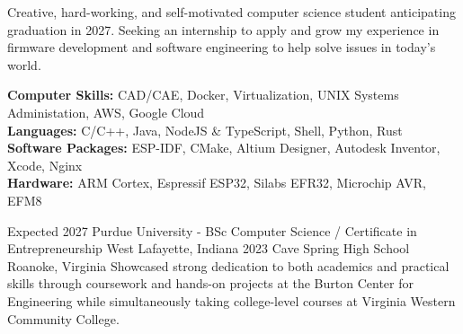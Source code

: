 \documentclass[9pt]{developercv} %
\begin{document}
\vspace{0.3cm}



\begin{minipage}[t]{1\textwidth} %
	\vspace{-\baselineskip} %
	Creative, hard-working, and self-motivated computer science student anticipating graduation in 2027. Seeking an internship to apply and grow my experience in firmware development and software engineering to help solve issues in today's world.
\end{minipage}

\vspace{0.3cm}


\begin{minipage}[t]{1\textwidth} %
	\vspace{-\baselineskip} %
	\textbf{Computer Skills:} CAD/CAE, Docker, Virtualization, UNIX Systems Administation, AWS, Google Cloud\\
	\textbf{Languages:} C/C++, Java, NodeJS \& TypeScript, Shell, Python, Rust\\
	\textbf{Software Packages:} ESP-IDF, CMake, Altium Designer, Autodesk Inventor, Xcode, Nginx\\
	\textbf{Hardware:} ARM Cortex, Espressif ESP32, Silabs EFR32, Microchip AVR, EFM8\\
\end{minipage}

\vspace{0.3cm}



\begin{entrylist}
	\entry
		{Expected 2027}
		{Purdue University - BSc Computer Science / Certificate in Entrepreneurship}
		{West Lafayette, Indiana}
		{}
	\entry
		{2023}
		{Cave Spring High School}
		{Roanoke, Virginia}
		{Showcased strong dedication to both academics and practical skills through coursework and hands-on projects at the Burton Center for Engineering while simultaneously taking college-level courses at Virginia Western Community College.}
\end{entrylist}
\end{document}
